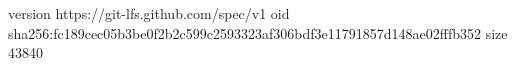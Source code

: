version https://git-lfs.github.com/spec/v1
oid sha256:fc189cec05b3be0f2b2c599c2593323af306bdf3e11791857d148ae02fffb352
size 43840
